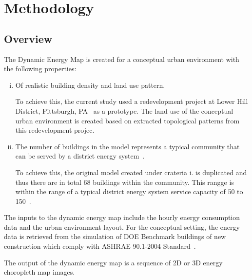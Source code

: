 
\chapter{Methodology} %

\label{Chapter4} %


\section{Overview}
The Dynamic Energy Map is created for a conceptual urban environment
with the following properties:
\begin{enumerate}[i.]
\item Of realistic building density and land use pattern.
  
  To achieve this, the current study used a redevelopment project at
  Lower Hill District, Pittsburgh, PA~\cite{Ramesh2013} as a
  prototype.  The land use of the conceptual urban environment is
  created based on extracted topological patterns from this
  redevelopment projec.

\item The number of buildings in the model represents a typical
  community that can be served by a district energy
  system~\cite{IDEA2012}.
  
  To achieve this, the original model created under crateria i. is
  duplicated and thus there are in total 68 buildings within the
  community. This rangge is within the range of a typical district
  energy system service capacity of 50 to 150~\cite{IDEA2012}.

\end{enumerate}

The inputs to the dynamic energy map include the hourly energy
consumption data and the urban environment layout. For the conceptual
setting, the energy data is retrieved from the simulation of DOE
Benchmark buildings of new construction which comply with ASHRAE
90.1-2004 Standard~\cite{DOE2015}.

The output of the dynamic energy map is a sequence of 2D or 3D energy
choropleth map images.

